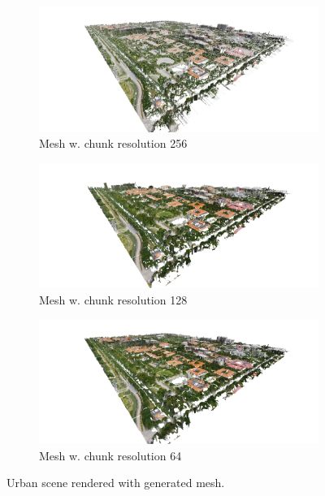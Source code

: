 \begin{figure}[h]
    \centering
    
    \begin{subfigure}{0.45\textwidth}
        \centering
        \includegraphics[width=\textwidth]{mesh-urban-256.jpg}
        \caption{Mesh w. chunk resolution 256}
        \label{fig:results:mesh-urban-256}
    \end{subfigure}
    \begin{subfigure}{0.45\textwidth}
        \centering
        \includegraphics[width=\textwidth]{mesh-urban-128.jpg}
        \caption{Mesh w. chunk resolution 128}
        \label{fig:results:mesh-urban-128}
    \end{subfigure}
    
    \begin{subfigure}{0.45\textwidth}
        \centering
        \includegraphics[width=\textwidth]{mesh-urban-64.jpg}
        \caption{Mesh w. chunk resolution 64}
        \label{fig:results:mesh-urban-64}
    \end{subfigure}
    
    \caption{Urban scene rendered with generated mesh.}
\end{figure}

